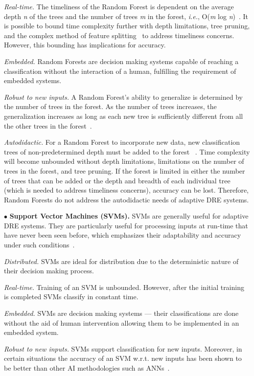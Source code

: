 \documentclass[conference]{IEEEtran}
\begin{document}
\emph{Real-time.} The timeliness of the Random Forest is dependent on the average depth \emph{n} of the trees and the number of trees \emph{m} in the forest, \emph{i.e.}, O(\emph{m} log \emph{n})~\cite{Lin:06}. It is possible to bound time complexity further with depth limitations, tree pruning, and the complex method of feature splitting~\cite{Ho:95} to address timeliness concerns. However, this bounding has implications for accuracy.

\emph{Embedded.} Random Forests are decision making systems capable of reaching a classification without the interaction of a human, fulfilling the requirement of embedded systems.

\emph{Robust to new inputs.} A Random Forest's ability to generalize is determined by the number of trees in the forest. As the number of trees increases, the generalization increases as long as each new tree is sufficiently different from all the other trees in the forest~\cite{Ho:95}.

\emph{Autodidactic.} For a Random Forest to incorporate new data, new classification trees of non-predetermined depth must be added to the forest ~\cite{Lin:06}. Time complexity will become unbounded without depth limitations, limitations on the number of trees in the forest, and tree pruning. If the forest is limited in either the number of trees that can be added or the depth and breadth of each individual tree (which is needed to address timeliness concerns), accuracy can be lost. Therefore, Random Forests do not address the autodidactic needs of adaptive DRE systems. 

$\bullet$ {\bf Support Vector Machines (SVMs).} SVMs are generally useful for adaptive DRE systems. They are particularly useful for processing inputs at run-time that have never been seen before, which emphasizes their adaptability and accuracy under such conditions~\cite{Hoffert:11}.

\emph{Distributed.} SVMs are ideal for distribution due to the deterministic nature of their decision making process.

\emph{Real-time.} Training of an SVM is unbounded. However, after the initial training is completed SVMs classify in constant time.

\emph{Embedded.} SVMs are decision making systems --- their classifications are done without the aid of human intervention allowing them to be implemented in an embedded system.

\emph{Robust to new inputs.} SVMs support classification for new inputs. Moreover, in certain situations the accuracy of an SVM w.r.t. new  inputs has been shown to be better than other AI methodologies such as ANNs~\cite{Hoffert:11}.
\end{document}
